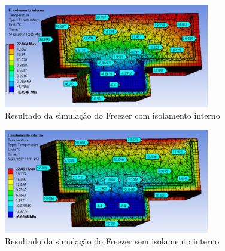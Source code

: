 \begin{itemize}
\begin{figure}[H]
\centering
 \includegraphics[width=0.8\textwidth]{figuras/isolamento_interno}
 \caption{Resultado da simulação do Freezer com isolamento interno}
 \label{fig:isolamento_interno}
\end{figure}

\begin{figure}[H]
\centering
 \includegraphics[width=0.8\textwidth]{figuras/sem_isolamento_interno}
 \caption{Resultado da simulação do Freezer sem isolamento interno}
 \label{fig:sem_isolamento_interno}
\end{figure}





\end{itemize}
